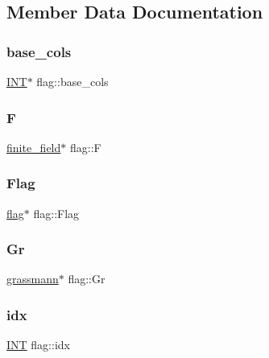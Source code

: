\subsection{Member Data Documentation}
\mbox{\label{classflag_a2078dba7382037bf731a88092d1b1c54}} 
\subsubsection{\texorpdfstring{base\+\_\+cols}{base\_cols}}
{\footnotesize\ttfamily \mbox{\hyperlink{galois_8h_a09fddde158a3a20bd2dcadb609de11dc}{I\+NT}}$\ast$ flag\+::base\+\_\+cols}

\mbox{\label{classflag_a32217a9c8e1d3d02b0177d6ec8158a2a}} 
\subsubsection{\texorpdfstring{F}{F}}
{\footnotesize\ttfamily \mbox{\hyperlink{classfinite__field}{finite\+\_\+field}}$\ast$ flag\+::F}

\mbox{\label{classflag_a495b6bcb56dbf03fbb9d1b33c4e8750b}} 
\subsubsection{\texorpdfstring{Flag}{Flag}}
{\footnotesize\ttfamily \mbox{\hyperlink{classflag}{flag}}$\ast$ flag\+::\+Flag}

\mbox{\label{classflag_a4e7e5cd2bcbab0651ec383cd6ee62f3d}} 
\subsubsection{\texorpdfstring{Gr}{Gr}}
{\footnotesize\ttfamily \mbox{\hyperlink{classgrassmann}{grassmann}}$\ast$ flag\+::\+Gr}

\mbox{\label{classflag_a756f878c42eebec879fb22b80f74d07a}} 
\subsubsection{\texorpdfstring{idx}{idx}}
{\footnotesize\ttfamily \mbox{\hyperlink{galois_8h_a09fddde158a3a20bd2dcadb609de11dc}{I\+NT}} flag\+::idx}

